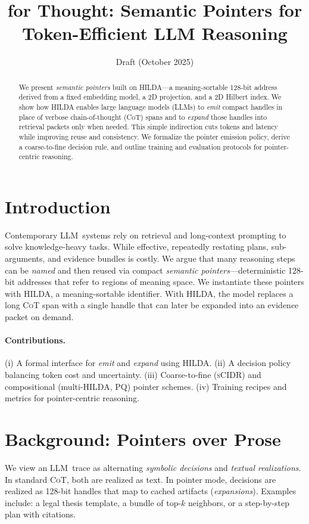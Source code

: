 \documentclass[11pt]{article}
\title{\textbf{\hilda{} for Thought: Semantic Pointers for Token-Efficient LLM Reasoning}}
\author{Draft (October 2025)}
\date{}
\newcommand{\hilda}{\textsc{HILDA}}
\newcommand{\scidr}{\textsc{sCIDR}}
\newcommand{\pq}{\textsc{PQ}}
\newcommand{\llm}{\textsc{LLM}}
\newcommand{\cot}{\textsc{CoT}}
\begin{document}
\maketitle

\begin{abstract}
We present \emph{semantic pointers} built on \hilda{}---a meaning-sortable 128-bit address derived from a fixed embedding model, a 2D projection, and a 2D Hilbert index. We show how \hilda{} enables large language models (\llm s) to \emph{emit} compact handles in place of verbose chain-of-thought (\cot) spans and to \emph{expand} those handles into retrieval packets only when needed. This simple indirection cuts tokens and latency while improving reuse and consistency. We formalize the pointer emission policy, derive a coarse-to-fine decision rule, and outline training and evaluation protocols for pointer-centric reasoning.
\end{abstract}

\section{Introduction}
Contemporary \llm\ systems rely on retrieval and long-context prompting to solve knowledge-heavy tasks. While effective, repeatedly restating plans, sub-arguments, and evidence bundles is costly. We argue that many reasoning steps can be \emph{named} and then reused via compact \emph{semantic pointers}---deterministic 128-bit addresses that refer to regions of meaning space. We instantiate these pointers with \hilda{}, a meaning-sortable identifier. With \hilda{}, the model replaces a long \cot{} span with a single handle that can later be expanded into an evidence packet on demand.

\paragraph{Contributions.} (i) A formal interface for \emph{emit} and \emph{expand} using \hilda{}. (ii) A decision policy balancing token cost and uncertainty. (iii) Coarse-to-fine (\scidr) and compositional (multi-\hilda{}, \pq) pointer schemes. (iv) Training recipes and metrics for pointer-centric reasoning.

\section{Background: Pointers over Prose}
We view an \llm\ trace as alternating \emph{symbolic decisions} and \emph{textual realizations}. In standard \cot, both are realized as text. In pointer mode, decisions are realized as 128-bit handles that map to cached artifacts (\emph{expansions}). Examples include: a legal thesis template, a bundle of top-$k$ neighbors, or a step-by-step plan with citations.
\end{document}
